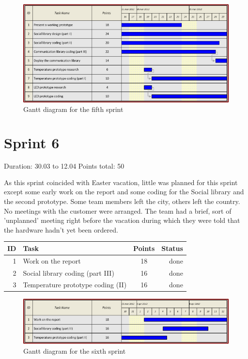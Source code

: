\begin{figure}[h!]
\centering \includegraphics[scale=0.8]{img/sprints-gantt5.png}
\caption{Gantt diagram for the fifth sprint}
\label{fig:sprints-gantt5}
\end{figure}


\newpage

\section{Sprint 6}

Duration: 30.03 to 12.04
Points total: 50

As this sprint coincided with Easter vacation, little was planned for this sprint
except some early work on the report and some coding for the Social library and the second prototype.
Some team members left the city, others left the country. No meetings with the customer were arranged.
The team had a brief, sort of 'unplanned' meeting right before the vacation during which they
were told that the hardware hadn't yet been ordered.

\begin{table}[ht!]
\begin{tabular}{ | r | l | c | r | }

\hline
\textbf{ID} & \textbf{Task} & \textbf{Points} & \textbf{Status} \\
\hline

1 & Work on the report					& 18 & done \\
\hline
2 & Social library coding (part III)	& 16 & done \\
\hline
3 & Temperature prototype coding (II)	& 16 & done \\
\hline

\end{tabular}
\end{table}

\begin{figure}[h!]
\centering \includegraphics[scale=0.8]{img/sprints-gantt6.png}
\caption{Gantt diagram for the sixth sprint}
\label{fig:sprints-gantt6}
\end{figure}

